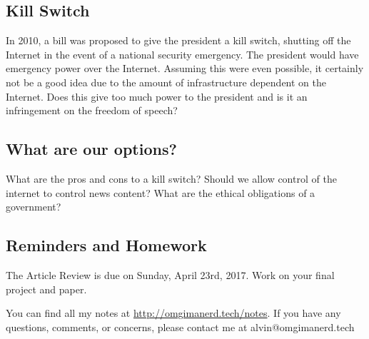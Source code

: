 \documentclass[letterpaper, 12pt]{article}
\begin{document}
\subsection*{Kill Switch}
In 2010, a bill was proposed to give the president a kill switch, shutting off
the Internet in the event of a national security emergency. The president
would have emergency power over the Internet. Assuming this were even possible,
it certainly not be a good idea due to the amount of infrastructure dependent on
the Internet. Does this give too much power to the president and is it an
infringement on the freedom of speech?

\subsection*{What are our options?}
What are the pros and cons to a kill switch? Should we allow control of the
internet to control news content? What are the ethical obligations of a
government?

\subsection*{Reminders and Homework}
The Article Review is due on Sunday, April 23rd, 2017.
Work on your final project and paper.

\begin{center}
  You can find all my notes at \url{http://omgimanerd.tech/notes}. If you have
  any questions, comments, or concerns, please contact me at
  alvin@omgimanerd.tech
\end{center}
\end{document}
